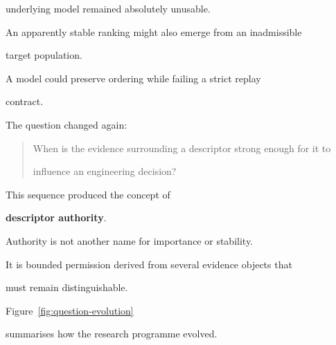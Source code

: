 \documentclass[11pt,a4paper,oneside]{report}
\providecommand{\term}[1]{\textbf{#1}}
\begin{document}
underlying model remained absolutely unusable.



An apparently stable ranking might also emerge from an inadmissible

target population.



A model could preserve ordering while failing a strict replay

contract.



The question changed again:



\begin{quote}



When is the evidence surrounding a descriptor strong enough for it to

influence an engineering decision?



\end{quote}



This sequence produced the concept of

\term{descriptor authority}.



Authority is not another name for importance or stability.



It is bounded permission derived from several evidence objects that

must remain distinguishable.



Figure~\ref{fig:question-evolution}

summarises how the research programme evolved.






\end{document}
